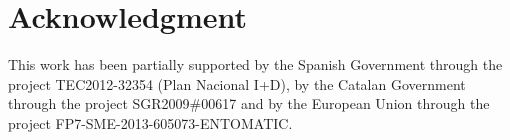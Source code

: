 \documentclass{llncs}
\begin{document}
\section*{Acknowledgment}
This work has been partially supported by the Spanish Government through the 
project TEC2012-32354 (Plan Nacional I+D), by the Catalan Government 
through the project SGR2009\#00617 and by the European Union through the 
project FP7-SME-2013-605073-ENTOMATIC.










\end{document}
